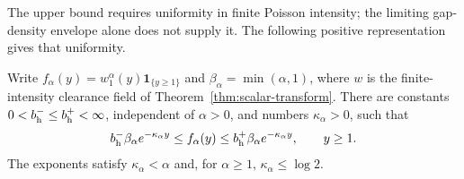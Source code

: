 \documentclass[11pt,letterpaper]{article}
\newcommand{\ind}{\mathbf 1}\newcommand{\Exp}{\operatorname{Exp}}
\begin{document}
The upper bound requires uniformity in finite Poisson intensity; the
limiting gap-density envelope alone does not supply it. The following
positive representation gives that uniformity.

\begin{lemma}
\label{lem:finite-intensity-envelope}
Write $f_\alpha(y)=w_1^\alpha(y)\ind_{\{y\ge1\}}$ and
$\beta_\alpha=\min(\alpha,1)$, where $w$ is the finite-intensity
clearance field of Theorem~\ref{thm:scalar-transform}.
There are constants $0<b_{\rm h}^-\le b_{\rm h}^+<\infty$,
independent of $\alpha>0$, and numbers $\kappa_\alpha>0$, such that
\begin{equation}\label{eq:finite-intensity-envelope}
 b_{\rm h}^-\beta_\alpha e^{-\kappa_\alpha y}
 \le f_\alpha(y)\le
 b_{\rm h}^+\beta_\alpha e^{-\kappa_\alpha y},
 \qquad y\ge1.
\end{equation}
The exponents satisfy $\kappa_\alpha<\alpha$ and, for $\alpha\ge1$,
$\kappa_\alpha\le\log2$.
\end{lemma}
\end{document}
